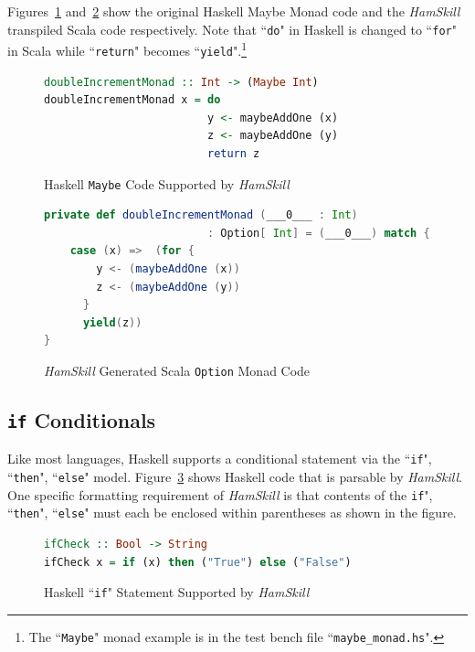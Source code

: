 \documentclass{report}
\begin{document}
Figures~\ref{fig:haskellMaybeMonad} and~\ref{fig:haskellOptionMonad} show the original Haskell Maybe Monad code and the \textit{HamSkill} transpiled Scala code respectively.  Note that ``\texttt{do}" in Haskell is changed to ``\texttt{for}" in Scala while ``\texttt{return}" becomes ``\texttt{yield}".\footnote{The ``\texttt{Maybe}" monad example is in the test bench file ``\texttt{maybe\_monad.hs}".}

\begin{figure}[H]
\begin{mdframed}
\begin{lstlisting}[language=Haskell]
doubleIncrementMonad :: Int -> (Maybe Int)
doubleIncrementMonad x = do
                         y <- maybeAddOne (x)
                         z <- maybeAddOne (y)
                         return z
\end{lstlisting}
\end{mdframed}
\caption{Haskell \texttt{Maybe} Code Supported by \textit{HamSkill}}
\label{fig:haskellMaybeMonad}
\end{figure}

\begin{figure}[H]
\begin{mdframed}
\begin{lstlisting}[language=Scala, basicstyle=\small]
private def doubleIncrementMonad (___0___ : Int) 
                         : Option[ Int] = (___0___) match {
    case (x) =>  (for {
        y <- (maybeAddOne (x))
        z <- (maybeAddOne (y))
      }
      yield(z))
}
\end{lstlisting}
\end{mdframed}
\caption{\textit{HamSkill} Generated Scala \texttt{Option} Monad Code}
\label{fig:haskellOptionMonad}
\end{figure}

\subsection{\texttt{if} Conditionals}

Like most languages, Haskell supports a conditional statement via the ``\texttt{if}", ``\texttt{then}", ``\texttt{else}" model.  Figure~\ref{fig:haskellFunctionIfCheck} shows Haskell code that is parsable by \textit{HamSkill}.  One specific formatting requirement of \textit{HamSkill} is that contents of the \texttt{if}", ``\texttt{then}", ``\texttt{else}" must each be enclosed within parentheses as shown in the figure.

\begin{figure}[H]
\begin{mdframed}
\begin{lstlisting}[language=Haskell]
ifCheck :: Bool -> String
ifCheck x = if (x) then ("True") else ("False")
\end{lstlisting}
\end{mdframed}
\caption{Haskell ``\texttt{if}" Statement Supported by \textit{HamSkill}}\label{fig:haskellFunctionIfCheck}
\end{figure}
\end{document}
